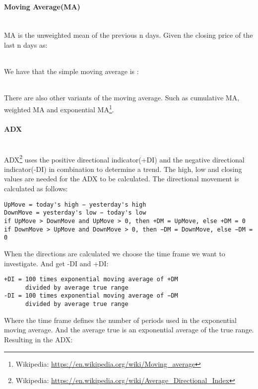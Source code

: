 \paragraph{Moving Average(MA)}
\hspace{0pt}\\
MA is the unweighted mean of the previous n days.
Given the closing price of the last n days as:

\\

We have that the simple moving average is : 

\\

There are also other variants of the moving average. Such as cumulative MA,
weighted MA and exponential MA\footnote{Wikipedia:
\url{https://en.wikipedia.org/wiki/Moving_average}}. 

\paragraph{ADX}
\hspace{0pt}\\
ADX\footnote{Wikipedia:
\url{https://en.wikipedia.org/wiki/Average_Directional_Index}} uses the positive directional indicator(+DI) and the negative directional
indicator(-DI) in combination to determine a trend. The high, low and closing
values are needed for the ADX to be calculated. The directional movement is
calculated as follows: 

\begin{verbatim}
UpMove = today's high − yesterday's high
DownMove = yesterday's low − today's low
if UpMove > DownMove and UpMove > 0, then +DM = UpMove, else +DM = 0
if DownMove > UpMove and DownMove > 0, then −DM = DownMove, else −DM = 0 
\end{verbatim} 

When the directions are calculated we choose the time frame we want to
investigate. And get -DI and +DI:

\begin{verbatim}
+DI = 100 times exponential moving average of +DM 
      divided by average true range
-DI = 100 times exponential moving average of −DM 
      divided by average true range 
\end{verbatim} 

Where the time frame defines the number of periods used in the exponential
moving average. And the average true is an exponential average of the true
range. Resulting in the ADX:

